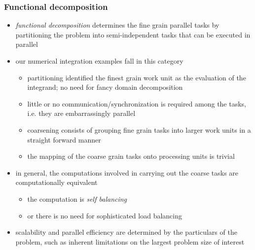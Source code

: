 %
%
%
%


\begin{frame}[fragile]
%
  \frametitle{Functional decomposition}
%
  \begin{itemize}
%
  \item {\em functional decomposition} determines the fine grain parallel tasks by partitioning
    the problem into semi-independent tasks that can be executed in parallel
%
  \item our numerical integration examples fall in this category
    \begin{itemize}
    \item partitioning identified the finest grain work unit as the evaluation of the
      integrand; no need for fancy domain decomposition
    \item little or no communication/synchronization is required among the tasks, i.e. they are
      embarrassingly parallel
    \item coarsening consists of grouping fine grain tasks into larger work units in a straight
      forward manner
    \item the mapping of the coarse grain tasks onto processing units is trivial
    \end{itemize}
%
  \item in general, the computations involved in carrying out the coarse tasks are
    computationally equivalent
    \begin{itemize}
    \item the computation is {\em self balancing}
    \item or there is no need for sophisticated load balancing
    \end{itemize}
%
  \item scalability and parallel efficiency are determined by the particulars of the problem,
    such as inherent limitations on the largest problem size of interest
%
  \end{itemize}
%
\end{frame}

